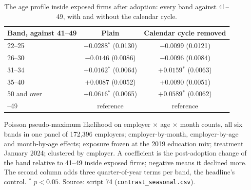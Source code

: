 \begin{table}[ht!]
\centering
\caption{The age profile inside exposed firms after adoption: every band against 41--49, with and without the calendar cycle.}
\label{tab:profile_seasonal}
\footnotesize
\begin{tabular}{lcc}
\toprule
Band, against 41--49 & Plain & Calendar cycle removed \\
\midrule
22--25 & $-0.0288$$^{*}$ (0.0130) & $-0.0099$ (0.0121) \\
26--30 & $-0.0146$ (0.0086) & $-0.0096$ (0.0084) \\
31--34 & $+0.0162$$^{*}$ (0.0064) & $+0.0159$$^{*}$ (0.0063) \\
35--40 & $+0.0087$ (0.0052) & $+0.0090$ (0.0051) \\
50 and over & $+0.0616$$^{*}$ (0.0065) & $+0.0589$$^{*}$ (0.0062) \\
\addlinespace[2pt]
41--49 & reference & reference \\
\bottomrule
\end{tabular}
\begin{minipage}{0.88\textwidth}\footnotesize\vspace{4pt}
Poisson pseudo-maximum likelihood on employer $\times$ age $\times$ month counts, all six bands in one panel of 172{,}396 employers; employer-by-month, employer-by-age and month-by-age effects; exposure frozen at the 2019 education mix; treatment January 2024; clustered by employer. A coefficient is the post-adoption change of the band relative to 41--49 inside exposed firms; negative means it declined more. The second column adds three quarter-of-year terms per band, the headline's control. $^{*}$ $p<0.05$. Source: script 74 (\texttt{contrast\_seasonal.csv}).
\end{minipage}
\end{table}
